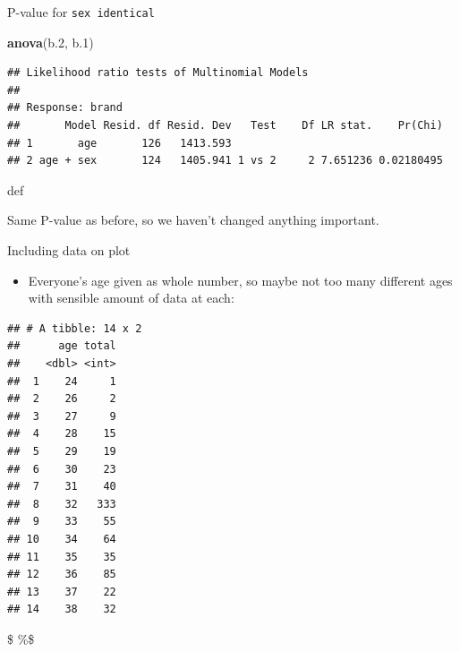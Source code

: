 \documentclass[ignorenonframetext,]{beamer}
\newenvironment{Shaded}{\begin{snugshade}}{\end{snugshade}}
\newcommand{\DataTypeTok}[1]{\textcolor[rgb]{0.13,0.29,0.53}{#1}}
\newcommand{\FloatTok}[1]{\textcolor[rgb]{0.00,0.00,0.81}{#1}}
\newcommand{\KeywordTok}[1]{\textcolor[rgb]{0.13,0.29,0.53}{\textbf{#1}}}
\newcommand{\NormalTok}[1]{#1}
\newcommand{\OperatorTok}[1]{\textcolor[rgb]{0.81,0.36,0.00}{\textbf{#1}}}
\newcommand{\StringTok}[1]{\textcolor[rgb]{0.31,0.60,0.02}{#1}}
\providecommand{\tightlist}{%
  \setlength{\itemsep}{0pt}\setlength{\parskip}{0pt}}
\begin{document}
\begin{frame}[fragile]{P-value for \texttt{sex\ identical}}
\protect\hypertarget{p-value-for-sex-identical}{}

\begin{Shaded}
\begin{Highlighting}[]
\KeywordTok{anova}\NormalTok{(b}\FloatTok{.2}\NormalTok{, b}\FloatTok{.1}\NormalTok{)}
\end{Highlighting}
\end{Shaded}

\begin{verbatim}
## Likelihood ratio tests of Multinomial Models
## 
## Response: brand
##       Model Resid. df Resid. Dev   Test    Df LR stat.    Pr(Chi)
## 1       age       126   1413.593                                 
## 2 age + sex       124   1405.941 1 vs 2     2 7.651236 0.02180495
\end{verbatim}

def

Same P-value as before, so we haven't changed anything important.

\end{frame}

\begin{frame}[fragile]{Including data on plot}
\protect\hypertarget{including-data-on-plot}{}

\begin{itemize}
\tightlist
\item
  Everyone's age given as whole number, so maybe not too many different
  ages with sensible amount of data at each:
\end{itemize}

\begin{Shaded}
\end{Shaded}

\begin{verbatim}
## # A tibble: 14 x 2
##      age total
##    <dbl> <int>
##  1    24     1
##  2    26     2
##  3    27     9
##  4    28    15
##  5    29    19
##  6    30    23
##  7    31    40
##  8    32   333
##  9    33    55
## 10    34    64
## 11    35    35
## 12    36    85
## 13    37    22
## 14    38    32
\end{verbatim}

\$ \%\$

\end{frame}
\end{document}
